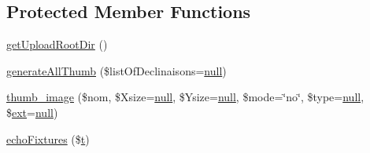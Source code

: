 \subsection*{Protected Member Functions}
\begin{DoxyCompactItemize}
\item 
\hyperlink{class_acme_group_1_1services_1_1aetools_1_1image_aetools_a04b77f7764c2a70c3a9223b79adb91c0}{get\+Upload\+Root\+Dir} ()
\item 
\hyperlink{class_acme_group_1_1services_1_1aetools_1_1image_aetools_a8db9d8b382fb04ca5d8b577413be19f4}{generate\+All\+Thumb} (\$list\+Of\+Declinaisons=\hyperlink{validate_8js_afb8e110345c45e74478894341ab6b28e}{null})
\item 
\hyperlink{class_acme_group_1_1services_1_1aetools_1_1image_aetools_a13d4fd5857bfc4360295af9df66ac047}{thumb\+\_\+image} (\$nom, \$Xsize=\hyperlink{validate_8js_afb8e110345c45e74478894341ab6b28e}{null}, \$Ysize=\hyperlink{validate_8js_afb8e110345c45e74478894341ab6b28e}{null}, \$mode=\char`\"{}no\char`\"{}, \$type=\hyperlink{validate_8js_afb8e110345c45e74478894341ab6b28e}{null}, \$\hyperlink{model_8ext_8js_a3ee7f56eeb48b6dc8bb1b162befb009f}{ext}=\hyperlink{validate_8js_afb8e110345c45e74478894341ab6b28e}{null})
\item 
\hyperlink{class_acme_group_1_1services_1_1aetools_1_1image_aetools_afb01d9265e934ec98f5e6a12f97e3c9c}{echo\+Fixtures} (\$\hyperlink{jquery_8knob_8js_aa09e7cf223942a40813c00a3897b7c48}{t})
\end{DoxyCompactItemize}
